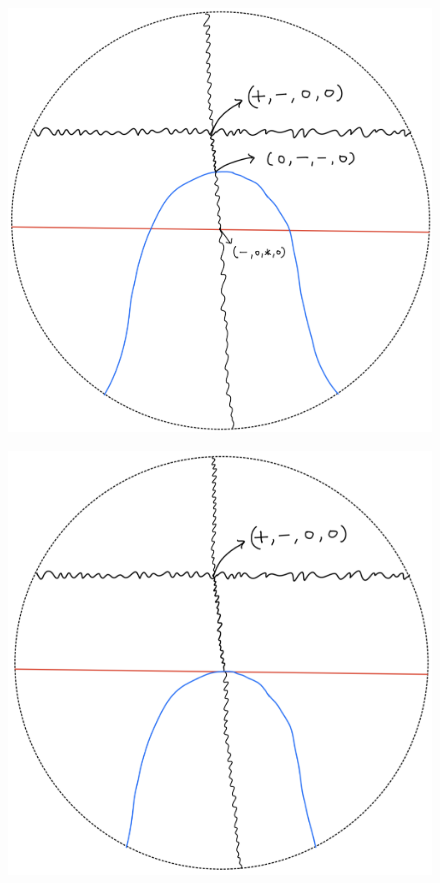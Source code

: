 \begin{definition}
\begin{enumerate}
\begin{itemize}
\begin{figure}[H]
    \caption{}
    \label{fig:your-label}
\end{figure}
\begin{figure}[H]
    \centering
    \includegraphics[scale = 0.45]{diagrams/cobord'2/19.png} 
    \caption{}
    \label{fig:your-label}
\end{figure}
\begin{figure}[H]
    \centering
    \includegraphics[scale = 0.45]{diagrams/cobord'2/20.png} 

\end{figure}
\end{itemize}
\end{enumerate}
\end{definition}
